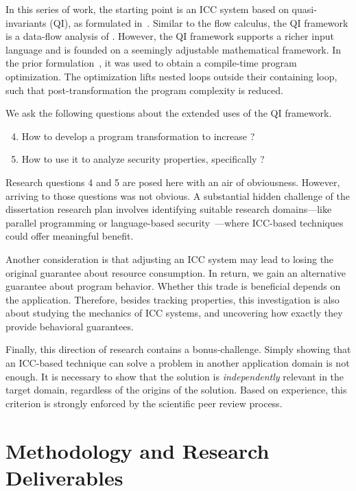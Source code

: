In this series of work, the starting point is an ICC system based on
quasi-invariants (QI), as formulated in~\cite{moyen20172}. Similar to the flow
calculus, the QI framework is a data-flow analysis of .
However, the QI framework supports a richer input language and is founded on a
seemingly adjustable mathematical framework. In the prior
formulation~\cite{moyen20172}, it was used to obtain a compile-time program
optimization. The optimization lifts nested loops outside their containing
loop, such that post-transformation the program
complexity is reduced.

We ask the following questions about the extended uses of the QI framework.
\begin{enumerate}[label={(RQ\arabic*)},leftmargin=*,labelindent=1em]
\setcounter{enumi}{3}
\item How to develop a program transformation to increase ?
\item How to use it to analyze security properties, specifically
?
\end{enumerate}
Research questions 4 and 5 are posed here with an air of obviousness. However,
arriving to those questions was not obvious. A substantial hidden challenge of
the dissertation research plan involves identifying suitable research
domains---like parallel programming or language-based
security~\cite{sabelfeld2003}---where ICC-based techniques could offer
meaningful benefit.

Another consideration is that adjusting an ICC system may lead to losing the
original guarantee about resource consumption. In return, we gain an alternative
guarantee about program behavior. Whether this trade is beneficial depends on
the application. Therefore, besides tracking properties, this investigation is
also about studying the mechanics of ICC systems, and uncovering how exactly
they provide behavioral guarantees.

Finally, this direction of research contains a bonus\hyp{}challenge. Simply
showing that an ICC-based technique can solve a problem in another application
domain is not enough. It is necessary to show that the solution is
\emph{independently} relevant in the target domain, regardless of the origins of
the solution. Based on experience, this criterion is strongly enforced by the
scientific peer review process.

\section{Methodology and Research Deliverables}
\label{sec:aicc-methods}

